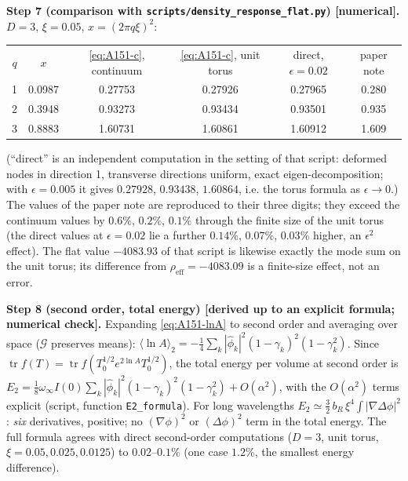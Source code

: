 \smallskip\noindent\textbf{Step 7 (comparison with \texttt{scripts/density\_response\_flat.py}) [numerical].}
$D=3$, $\xi=0.05$, $x=(2\pi q\xi)^2$:
\begin{center}\small
\begin{tabular}{cccccc}
$q$ & $x$ & \eqref{eq:A151-c}, continuum & \eqref{eq:A151-c}, unit torus & direct, $\epsilon=0.02$ & paper note\\
1 & 0.0987 & 0.27753 & 0.27926 & 0.27965 & 0.280\\
2 & 0.3948 & 0.93273 & 0.93434 & 0.93501 & 0.935\\
3 & 0.8883 & 1.60731 & 1.60861 & 1.60912 & 1.609
\end{tabular}
\end{center}
(``direct'' is an independent computation in the setting of that script: deformed nodes in direction 1, transverse
directions uniform, exact eigen-decomposition; with $\epsilon=0.005$ it gives $0.27928$, $0.93438$, $1.60864$, i.e.
the torus formula as $\epsilon\to0$.) The values of the paper note are reproduced to their three digits; they exceed
the continuum values by $0.6\%$, $0.2\%$, $0.1\%$ through the finite size of the unit torus (the direct values at
$\epsilon=0.02$ lie a further $0.14\%$, $0.07\%$, $0.03\%$ higher, an $\epsilon^2$ effect). The flat value $-4083.93$ of that script is likewise exactly the mode sum on the unit torus;
its difference from $\rho_{\mathrm{eff}}=-4083.09$ is a finite-size effect, not an error.

\smallskip\noindent\textbf{Step 8 (second order, total energy) [derived up to an explicit formula; numerical check].}
Expanding \eqref{eq:A151-lnA} to second order and averaging over space ($\mathcal G$ preserves means):
$\langle\ln A\rangle_2=-\tfrac14\sum_k|\hat\phi_k|^2(1-\gamma_k)^2(1-\gamma_k^2)$. Since $\operatorname{tr}f(T)=
\operatorname{tr}f(T_0^{1/2}e^{2\ln A}T_0^{1/2})$, the total energy per volume at second order is
$E_2=\tfrac18\omega_\infty I(0)\sum_k|\hat\phi_k|^2(1-\gamma_k)^2(1-\gamma_k^2)+O(\alpha^2)$, with the $O(\alpha^2)$
terms explicit (script, function \texttt{E2\_formula}). For long wavelengths
$E_2\simeq\tfrac32\,b_R\,\xi^4\int|\nabla\Delta\phi|^2$: \emph{six} derivatives, positive; no $(\nabla\phi)^2$ or
$(\Delta\phi)^2$ term in the total energy. The full formula agrees with direct second-order computations ($D=3$, unit
torus, $\xi=0.05,0.025,0.0125$) to $0.02$--$0.1\%$ (one case $1.2\%$, the smallest energy difference).

